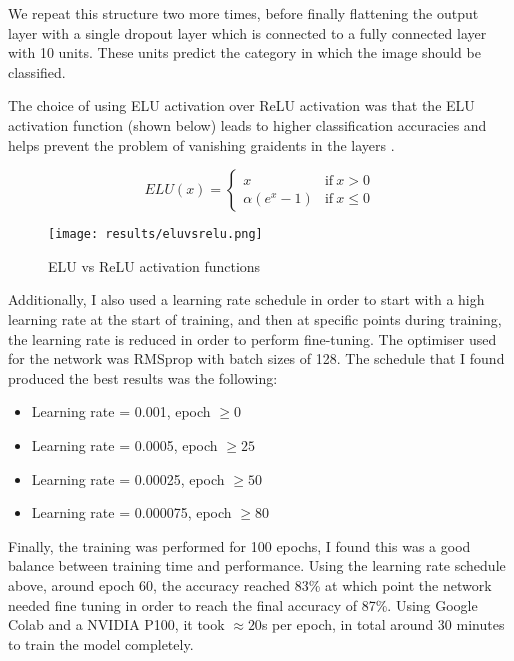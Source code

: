 \documentclass[12pt]{article}
\begin{document}
We repeat this structure two more times, before finally flattening the output layer with a single dropout layer which is connected to a fully connected layer with 10 units. These units predict the category in which the image should be classified.

The choice of using ELU activation over ReLU activation was that the ELU activation function (shown below) leads to higher classification accuracies and helps prevent the problem of vanishing graidents in the layers \cite{clevert2015fast}.

\begin{figure}[htbp]
  \centering
  \begin{minipage}{0.4\textwidth}
    \centering
    \begin{equation}
      ELU(x) = \begin{cases} x                 & \text{if}~x > 0    \\
        \alpha ( e^x - 1) & \text{if}~x \leq 0\end{cases}
    \end{equation}
  \end{minipage}\hfill
  \begin{minipage}{0.4\textwidth}
    \centering
    \texttt{[image: results/eluvsrelu.png]}
    \caption{ELU vs ReLU activation functions
      \label{fig:eluvsrelu}
    }
  \end{minipage}
\end{figure}
\newpage

Additionally, I also used a learning rate schedule in order to start with a high learning rate at the start of training, and then at specific points during training, the learning rate is reduced in order to perform fine-tuning. The optimiser used for the network was RMSprop with batch sizes of 128. The schedule that I found produced the best results was the following:

\begin{itemize}
  \item Learning rate = 0.001, epoch $\geq 0$
  \item Learning rate = 0.0005, epoch $\ge 25$
  \item Learning rate = 0.00025, epoch $\ge 50$
  \item Learning rate = 0.000075, epoch $\ge 80$
\end{itemize}

Finally, the training was performed for 100 epochs, I found this was a good balance between training time and performance. Using the learning rate schedule above, around epoch 60, the accuracy reached 83\% at which point the network needed fine tuning in order to reach the final accuracy of 87\%. Using Google Colab and a NVIDIA P100, it took $\approx 20$s per epoch, in total around 30 minutes to train the model completely.
\end{document}
